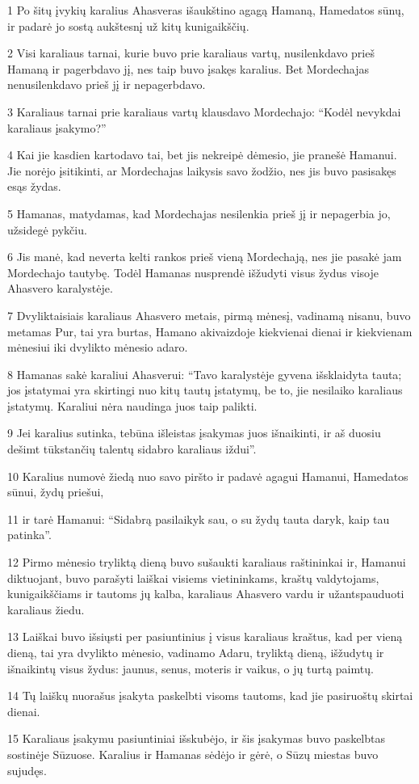 \par 1 Po šitų įvykių karalius Ahasveras išaukštino agagą Hamaną, Hamedatos sūnų, ir padarė jo sostą aukštesnį už kitų kunigaikščių. 
\par 2 Visi karaliaus tarnai, kurie buvo prie karaliaus vartų, nusilenkdavo prieš Hamaną ir pagerbdavo jį, nes taip buvo įsakęs karalius. Bet Mordechajas nenusilenkdavo prieš jį ir nepagerbdavo. 
\par 3 Karaliaus tarnai prie karaliaus vartų klausdavo Mordechajo: “Kodėl nevykdai karaliaus įsakymo?” 
\par 4 Kai jie kasdien kartodavo tai, bet jis nekreipė dėmesio, jie pranešė Hamanui. Jie norėjo įsitikinti, ar Mordechajas laikysis savo žodžio, nes jis buvo pasisakęs esąs žydas. 
\par 5 Hamanas, matydamas, kad Mordechajas nesilenkia prieš jį ir nepagerbia jo, užsidegė pykčiu. 
\par 6 Jis manė, kad neverta kelti rankos prieš vieną Mordechają, nes jie pasakė jam Mordechajo tautybę. Todėl Hamanas nusprendė išžudyti visus žydus visoje Ahasvero karalystėje. 
\par 7 Dvyliktaisiais karaliaus Ahasvero metais, pirmą mėnesį, vadinamą nisanu, buvo metamas Pur, tai yra burtas, Hamano akivaizdoje kiekvienai dienai ir kiekvienam mėnesiui iki dvylikto mėnesio adaro. 
\par 8 Hamanas sakė karaliui Ahasverui: “Tavo karalystėje gyvena išsklaidyta tauta; jos įstatymai yra skirtingi nuo kitų tautų įstatymų, be to, jie nesilaiko karaliaus įstatymų. Karaliui nėra naudinga juos taip palikti. 
\par 9 Jei karalius sutinka, tebūna išleistas įsakymas juos išnaikinti, ir aš duosiu dešimt tūkstančių talentų sidabro karaliaus iždui”. 
\par 10 Karalius numovė žiedą nuo savo piršto ir padavė agagui Hamanui, Hamedatos sūnui, žydų priešui, 
\par 11 ir tarė Hamanui: “Sidabrą pasilaikyk sau, o su žydų tauta daryk, kaip tau patinka”. 
\par 12 Pirmo mėnesio tryliktą dieną buvo sušaukti karaliaus raštininkai ir, Hamanui diktuojant, buvo parašyti laiškai visiems vietininkams, kraštų valdytojams, kunigaikščiams ir tautoms jų kalba, karaliaus Ahasvero vardu ir užantspauduoti karaliaus žiedu. 
\par 13 Laiškai buvo išsiųsti per pasiuntinius į visus karaliaus kraštus, kad per vieną dieną, tai yra dvylikto mėnesio, vadinamo Adaru, tryliktą dieną, išžudytų ir išnaikintų visus žydus: jaunus, senus, moteris ir vaikus, o jų turtą paimtų. 
\par 14 Tų laiškų nuorašus įsakyta paskelbti visoms tautoms, kad jie pasiruoštų skirtai dienai. 
\par 15 Karaliaus įsakymu pasiuntiniai išskubėjo, ir šis įsakymas buvo paskelbtas sostinėje Sūzuose. Karalius ir Hamanas sėdėjo ir gėrė, o Sūzų miestas buvo sujudęs.




